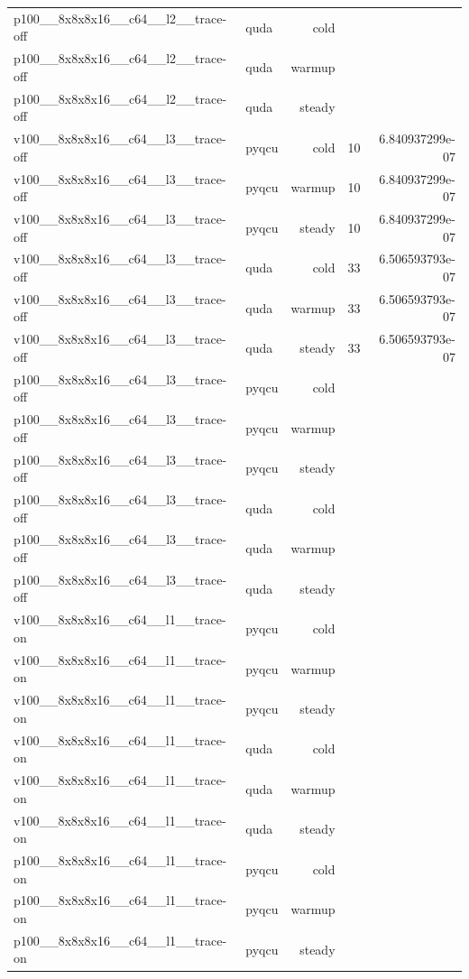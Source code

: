 \begin{table}[htbp]
\begin{tabular}{@{}llrrr@{}}
p100\_\_8x8x8x16\_\_c64\_\_l2\_\_trace-off & quda & cold &  &  \\
p100\_\_8x8x8x16\_\_c64\_\_l2\_\_trace-off & quda & warmup &  &  \\
p100\_\_8x8x8x16\_\_c64\_\_l2\_\_trace-off & quda & steady &  &  \\
v100\_\_8x8x8x16\_\_c64\_\_l3\_\_trace-off & pyqcu & cold & 10 & 6.840937299e-07 \\
v100\_\_8x8x8x16\_\_c64\_\_l3\_\_trace-off & pyqcu & warmup & 10 & 6.840937299e-07 \\
v100\_\_8x8x8x16\_\_c64\_\_l3\_\_trace-off & pyqcu & steady & 10 & 6.840937299e-07 \\
v100\_\_8x8x8x16\_\_c64\_\_l3\_\_trace-off & quda & cold & 33 & 6.506593793e-07 \\
v100\_\_8x8x8x16\_\_c64\_\_l3\_\_trace-off & quda & warmup & 33 & 6.506593793e-07 \\
v100\_\_8x8x8x16\_\_c64\_\_l3\_\_trace-off & quda & steady & 33 & 6.506593793e-07 \\
p100\_\_8x8x8x16\_\_c64\_\_l3\_\_trace-off & pyqcu & cold &  &  \\
p100\_\_8x8x8x16\_\_c64\_\_l3\_\_trace-off & pyqcu & warmup &  &  \\
p100\_\_8x8x8x16\_\_c64\_\_l3\_\_trace-off & pyqcu & steady &  &  \\
p100\_\_8x8x8x16\_\_c64\_\_l3\_\_trace-off & quda & cold &  &  \\
p100\_\_8x8x8x16\_\_c64\_\_l3\_\_trace-off & quda & warmup &  &  \\
p100\_\_8x8x8x16\_\_c64\_\_l3\_\_trace-off & quda & steady &  &  \\
v100\_\_8x8x8x16\_\_c64\_\_l1\_\_trace-on & pyqcu & cold &  &  \\
v100\_\_8x8x8x16\_\_c64\_\_l1\_\_trace-on & pyqcu & warmup &  &  \\
v100\_\_8x8x8x16\_\_c64\_\_l1\_\_trace-on & pyqcu & steady &  &  \\
v100\_\_8x8x8x16\_\_c64\_\_l1\_\_trace-on & quda & cold &  &  \\
v100\_\_8x8x8x16\_\_c64\_\_l1\_\_trace-on & quda & warmup &  &  \\
v100\_\_8x8x8x16\_\_c64\_\_l1\_\_trace-on & quda & steady &  &  \\
p100\_\_8x8x8x16\_\_c64\_\_l1\_\_trace-on & pyqcu & cold &  &  \\
p100\_\_8x8x8x16\_\_c64\_\_l1\_\_trace-on & pyqcu & warmup &  &  \\
p100\_\_8x8x8x16\_\_c64\_\_l1\_\_trace-on & pyqcu & steady &  &  \\

\end{tabular}
\end{table}
